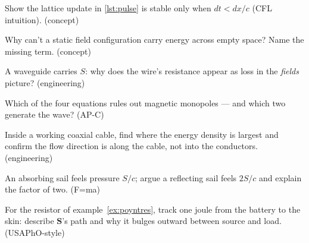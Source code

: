 \begin{exercise}[medium]
Show the lattice update in \ref{lst:pulse} is stable only when
$dt<dx/c$ (CFL intuition). (concept)
\end{exercise}
\begin{exercise}[medium]
Why can't a static field configuration carry energy across empty
space? Name the missing term. (concept)
\end{exercise}
\begin{exercise}[medium]
A waveguide carries $S$: why does the wire's resistance appear as
loss in the \emph{fields} picture? (engineering)
\end{exercise}
\begin{exercise}[easy]
Which of the four equations rules out magnetic monopoles --- and which
two generate the wave? (AP-C)
\end{exercise}
\begin{exercise}[medium]
Inside a working coaxial cable, find where the energy density is
largest and confirm the flow direction is along the cable, not into
the conductors. (engineering)
\end{exercise}
\begin{exercise}[medium]
An absorbing sail feels pressure $S/c$; argue a reflecting sail feels
$2S/c$ and explain the factor of two. (F=ma)
\end{exercise}
\begin{exercise}[hard]
For the resistor of example~\ref{ex:poyntres}, track one joule from
the battery to the skin: describe $\mathbf S$'s path and why it
bulges outward between source and load. (USAPhO-style)
\end{exercise}
